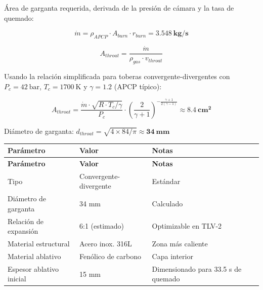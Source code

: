 \documentclass[11pt, a4paper]{article}
\begin{document}
\'{A}rea de garganta requerida, derivada de la presi\'{o}n de c\'{a}mara y la tasa de quemado:

\begin{equation}
  \dot{m} = \rho_{APCP} \cdot A_{burn} \cdot r_{burn} = \mathbf{3.548\ \text{kg/s}}
\end{equation}

\begin{equation}
  A_{throat} = \frac{\dot{m}}{\rho_{gas} \cdot v_{throat}}
\end{equation}

Usando la relaci\'{o}n simplificada para toberas convergente-divergentes con $P_c = 42\ \text{bar}$, $T_c = 1700\ \text{K}$ y $\gamma = 1.2$ (APCP t\'{i}pico):

\begin{equation}
  A_{throat} = \frac{\dot{m} \cdot \sqrt{R \cdot T_c / \gamma}}{P_c}
  \cdot \left(\frac{2}{\gamma+1}\right)^{-\frac{\gamma+1}{2(\gamma-1)}}
  \approx \mathbf{8.4\ \text{cm}^2}
\end{equation}

Di\'{a}metro de garganta: $d_{throat} = \sqrt{4 \times 84 / \pi} \approx \mathbf{34\ \text{mm}}$

\begin{longtable}{L{5.5cm} C{3cm} L{5cm}}
  \color{white}\textbf{Par\'{a}metro} &
  \color{white}\textbf{Valor} &
  \color{white}\textbf{Notas} \\
  \endfirsthead
  \color{white}\textbf{Par\'{a}metro} &
  \color{white}\textbf{Valor} &
  \color{white}\textbf{Notas} \\
  \endhead
  Tipo                     & Convergente-divergente & Est\'{a}ndar \\
  Di\'{a}metro de garganta & 34 mm                  & Calculado \\
  Relaci\'{o}n de expansi\'{o}n & 6:1 (estimado)    & Optimizable en TLV-2 \\
  Material estructural     & Acero inox. 316L        & Zona m\'{a}s caliente \\
  Material ablativo        & Fen\'{o}lico de carbono & Capa interior \\
  Espesor ablativo inicial & 15 mm                   & Dimensionado para 33.5 s de quemado \\
\end{longtable}

\end{document}
